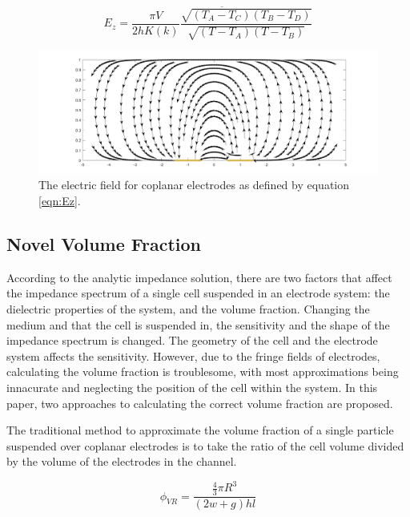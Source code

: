  \begin{equation}
    E_z = \overline{\frac{\pi V}{2hK(k)} \frac{\sqrt{(T_A-T_C)(T_B-T_D)}}{\sqrt{(T-T_A)(T-T_B)}}}
    \label{eqn:Ez}
 \end{equation}
 
 
     \begin{figure}[h]
        \centering
        \includegraphics[width=\textwidth]{images/Ez.png}
        \caption[Electric Field for Coplanar Electrodes]{The electric field for coplanar electrodes as defined by equation \ref{eqn:Ez}.}
        \label{fig:Ez}
    \end{figure}

\subsection{Novel Volume Fraction}
\par According to the analytic impedance solution, there are two factors that affect the impedance spectrum of a single cell suspended in an electrode system: the dielectric properties of the system, and the volume fraction. Changing the medium and that the cell is suspended in, the sensitivity and the shape of the impedance spectrum is changed. The geometry of the cell and the electrode system affects the sensitivity. However, due to the fringe fields of electrodes, calculating the volume fraction is troublesome, with most approximations being innacurate and neglecting the position of the cell within the system. In this paper, two approaches to calculating the correct volume fraction are proposed.

\par The traditional method to approximate the volume fraction of a single particle suspended over coplanar electrodes is to take the ratio of the cell volume divided by the volume of the electrodes in the channel.

\begin{equation}
    \phi_{VR} = \frac{\frac{4}{3}\pi R^3}{(2w+g)hl}
\end{equation}

